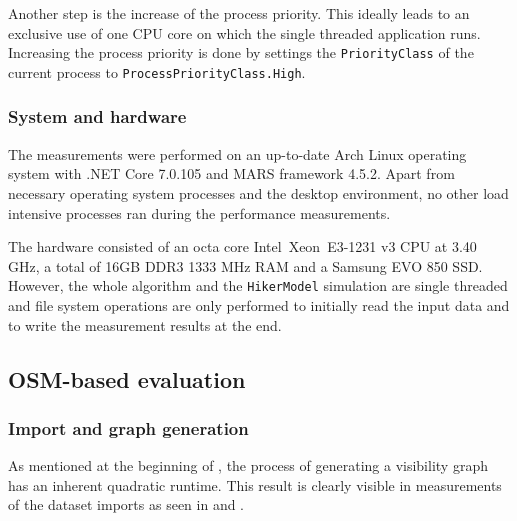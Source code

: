 			Another step is the increase of the process priority.
			This ideally leads to an exclusive use of one CPU core on which the single threaded application runs.
			Increasing the process priority is done by settings the \texttt{PriorityClass} of the current process to \texttt{ProcessPriorityClass.High}.
		
		\subsubsection{System and hardware}
		
			The measurements were performed on an up-to-date Arch Linux operating system with .NET Core 7.0.105 and MARS framework 4.5.2.
			Apart from necessary operating system processes and the desktop environment, no other load intensive processes ran during the performance measurements.
			
			The hardware consisted of an octa core Intel\textregistered\ Xeon\textregistered\ E3-1231 v3 CPU at 3.40 GHz, a total of 16GB DDR3 1333 MHz RAM and a Samsung EVO 850 SSD.
			However, the whole algorithm and the \texttt{HikerModel} simulation are single threaded and file system operations are only performed to initially read the input data and to write the measurement results at the end.
	
	\subsection{OSM-based evaluation}
		
		\subsubsection{Import and graph generation}
		
			As mentioned at the beginning of , the process of generating a visibility graph has an inherent quadratic runtime.
			This result is clearly visible in measurements of the dataset imports as seen in  and .
			
